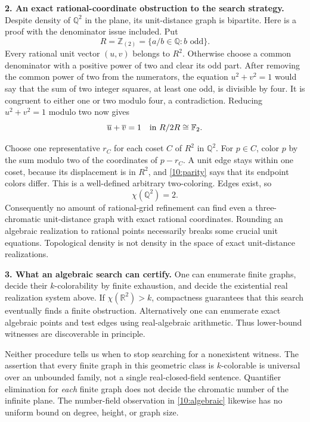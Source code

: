 \documentclass[11pt,a4paper]{article}
\newcommand{\Z}{\mathbb{Z}}
\newcommand{\Q}{\mathbb{Q}}
\newcommand{\R}{\mathbb{R}}
\newcommand{\F}{\mathbb{F}}
\numberwithin{equation}{section}
\begin{document}
\textbf{2. An exact rational-coordinate obstruction to the search strategy.}
Despite density of $\Q^2$ in the plane, its unit-distance graph is
bipartite. Here is a proof with the denominator issue included. Put
\[
 R=\Z_{(2)}=\{a/b\in\Q:b\text{ odd}\}.
\]
Every rational unit vector $(u,v)$ belongs to $R^2$. Otherwise choose a
common denominator with a positive power of two and clear its odd part.
After removing the common power of two from the numerators, the equation
$u^2+v^2=1$ would say that the sum of two integer squares, at least one
odd, is divisible by four. It is congruent to either one or two modulo
four, a contradiction. Reducing $u^2+v^2=1$ modulo two now gives
\begin{equation}\label{10:parity}
 \overline u+\overline v=1\quad\hbox{in }R/2R\cong\F_2.
\end{equation}

Choose one representative $r_C$ for each coset $C$ of $R^2$ in $\Q^2$.
For $p\in C$, color $p$ by the sum modulo two of the coordinates of
$p-r_C$. A unit edge stays within one coset, because its displacement is
in $R^2$, and \eqref{10:parity} says that its endpoint colors differ.
This is a well-defined arbitrary two-coloring. Edges exist, so
\[
 \chi(\Q^2)=2.
\]
Consequently no amount of rational-grid refinement can find even a
three-chromatic unit-distance graph with exact rational coordinates.
Rounding an algebraic realization to rational points necessarily breaks
some crucial unit equations. Topological density is not density in the
space of exact unit-distance realizations.

\textbf{3. What an algebraic search can certify.}
One can enumerate finite graphs, decide their $k$-colorability by finite
exhaustion, and decide the existential real realization system above.
If $\chi(\R^2)>k$, compactness guarantees that this search eventually
finds a finite obstruction. Alternatively one can enumerate exact
algebraic points and test edges using real-algebraic arithmetic. Thus
lower-bound witnesses are discoverable in principle.

Neither procedure tells us when to stop searching for a nonexistent
witness. The assertion that every finite graph in this geometric class
is $k$-colorable is universal over an unbounded family, not a single
real-closed-field sentence. Quantifier elimination for \emph{each}
finite graph does not decide the chromatic number of the infinite plane.
The number-field observation in \eqref{10:algebraic} likewise has no
uniform bound on degree, height, or graph size.
\end{document}
